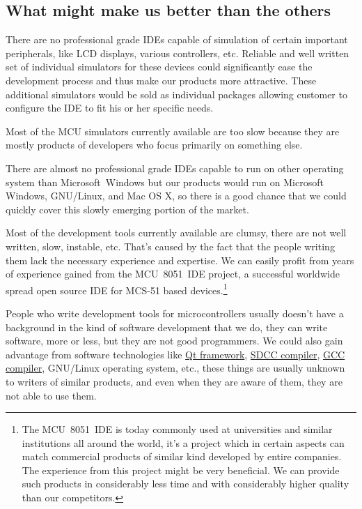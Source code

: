 \documentclass[a4paper,twoside,15pt]{book}
\begin{document}
		\subsection{What might make us better than the others}
			\begin{dinglist}{73}
				\item There are no professional grade IDEs capable of simulation of certain important peripherals, like LCD displays, various controllers, etc. Reliable and well written set of individual simulators for these devices could significantly ease the development process and thus make our products more attractive. These additional simulators would be sold as individual packages allowing customer to configure the IDE to fit his or her specific needs.
				\item Most of the MCU simulators currently available are too slow because they are mostly products of developers who focus primarily on something else.
				\item There are almost no professional grade IDEs capable to run on other operating system than Microsoft\textregistered{}~Windows\textregistered{} but our products would run on Microsoft Windows, GNU/Linux, and Mac OS X, so there is a good chance that we could quickly cover this slowly emerging portion of the market.
				\item Most of the development tools currently available are clumsy, there are not well written, slow, instable, etc. That's caused by the fact that the people writing them lack the necessary experience and expertise. We can easily profit from years of experience gained from the MCU~8051~IDE project, a successful worldwide spread open source IDE for MCS-51 based devices.\footnote{The MCU~8051~IDE is today commonly used at universities and similar institutions all around the world, it's a project which in certain aspects can match commercial products of similar kind developed by entire companies. The experience from this project might be very beneficial. We can provide such products in considerably less time and with considerably higher quality than our competitors.}
				\item People who write development tools for microcontrollers usually doesn't have a background in the kind of software development that we do, they can write software, more or less, but they are not good programmers. We could also gain advantage from software technologies like \href{http://en.wikipedia.org/wiki/Qt_framework}{Qt framework}, \href{http://en.wikipedia.org/wiki/Small_Device_C_Compiler}{SDCC compiler}, \href{http://en.wikipedia.org/wiki/GNU_Compiler_Collection}{GCC compiler}, GNU/Linux operating system, etc., these things are usually unknown to writers of similar products, and even when they are aware of them, they are not able to use them.
			\end{dinglist}
\end{document}
